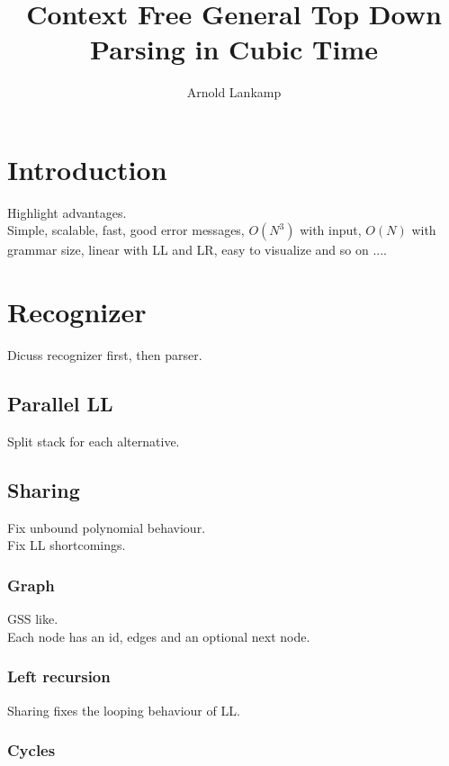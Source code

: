 \documentclass[a4paper,10pt]{article}
\title{Context Free General Top Down Parsing in Cubic Time}
\author{Arnold Lankamp}
\begin{document}
\maketitle

\begin{abstract}

\end{abstract}

\section{Introduction}

Highlight advantages.\\
Simple, scalable, fast, good error messages, $O(N^3)$ with input, $O(N)$ with grammar size, linear with LL and LR, easy to visualize and so on ....

\section{Recognizer}

Dicuss recognizer first, then parser.

\subsection{Parallel LL}

Split stack for each alternative.

\subsection{Sharing}

Fix unbound polynomial behaviour.\\
Fix LL shortcomings.

\subsubsection{Graph}

GSS like.\\
Each node has an id, edges and an optional next node.

\subsubsection{Left recursion}

Sharing fixes the looping behaviour of LL.

\subsubsection{Cycles}
\end{document}
